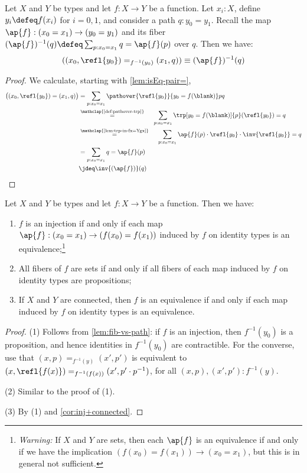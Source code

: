\begin{lemma}\label{lem:fib-vs-path}
Let $X$ and $Y$ be types and let $f:X\to Y$ be a function.
Let $x_i:X$, define $y_i\defeq f(x_i)$ for $i=0,1$, and consider a path $q:y_0 = y_1$.
Recall the map $\ap{f}: (x_0=x_1) \to (y_0 = y_1)$ and its fiber
$(\ap{f})^{-1}(q) \defeq \sum_{p:x_0=x_1} q =\ap{f}(p)$ over $q$.
Then we have:
\[
((x_0,\refl{y_0})=_{f^{-1}(y_0)}(x_1,q))\equiv (\ap{f})^{-1}(q)
\]
\end{lemma}
\begin{proof}
  We calculate, starting with \cref{lem:isEq-pair=},
  \begin{align*}
    \bigl((x_0,\refl{y_0})=(x_1,q)\bigr)
    &= \sum_{p:x_0=x_1} \pathover {\refl{y_0}} {y_0=f(\blank)} p q \\
    &\stackrel{\mathclap{\text{\cref{def:pathover-trp}}}}{=}\quad\;
      \sum_{p:x_0=x_1} \trp[y_0=f(\blank)]{p} ( \refl{y_0} ) = q \\
    &\stackrel{\mathclap{\text{\cref{lem:trp-in-fx=Ygx}}}}{=}\quad\;
     \sum_{p:x_0=x_1} \ap{f}(p)\cdot\refl{y_0}\cdot\inv{\refl{y_0}} = q \\
    &= \sum_{p:x_0=x_1} q = \ap{f}(p) \\
    &\jdeq \inv{(\ap{f})}(q) \qedhere
  \end{align*}
\end{proof}

\begin{corollary}\label{cor:fib-vs-path}\label{lem:eqandcovofconntypes}
Let $X$ and $Y$ be types and let $f:X\to Y$ be a function. Then we have:
\begin{enumerate}
\item\label{prop-fib-vs-path}
  $f$ is an injection if and only if each map $\ap{f} : (x_0 = x_1) \to (f(x_0) = f(x_1))$ induced by $f$
  on identity types is an equivalence;\footnote{%
    \emph{Warning:}
    If $X$ and $Y$ are sets, then each $\ap{f}$ is an equivalence
    if and only if we have the implication $(f(x_0) = f(x_1)) \to (x_0 = x_1)$,
    but this is in general not sufficient.}
\item\label{set-fib-vs-path}
All fibers of $f$ are sets if and only if all fibers of each map induced by $f$ on identity types are propositions;
\item\label{conn-fib-vs-path}
If $X$ and $Y$ are connected, then $f$ is an equivalence
if and only if each map induced by $f$ on identity types is an equivalence.
\end{enumerate}
\end{corollary}
\begin{proof}
(1) Follows from \cref{lem:fib-vs-path}: if $f$ is an injection,
then $f^{-1}(y_0)$ is a proposition, and hence identities in $f^{-1}(y_0)$
are contractible. For the converse, use that $(x,p)=_{f^{-1}(y)}(x',p')$ is
equivalent to $(x,\refl{f(x)}) =_{f^{-1}(f(x))} (x',p'\cdot p^{-1})$,
for all $(x,p),(x',p') : f^{-1}(y)$.

(2) Similar to the proof of (1).

(3) By (1) and \cref{cor:inj+connected}.
\end{proof}

